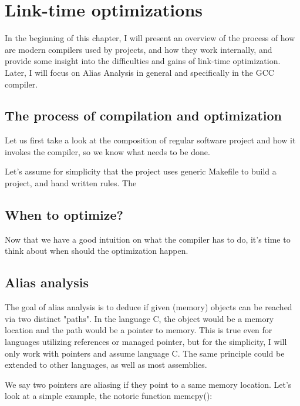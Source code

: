%
\newcommand{\definice}{\paragraph{Definice.}}

\chapter{Link-time optimizations}

In the beginning of this chapter, I will present an overview of the process of
how are modern compilers used by projects, and how they work internally, and
provide some insight into the difficulties and gains of link-time optimization.
Later, I will focus on Alias Analysis in general and specifically in the GCC
compiler.

\section{The process of compilation and optimization}

Let us first take a look at the composition of regular software project and how
it invokes the compiler, so we know what needs to be done.

Let's assume for simplicity that the project uses generic Makefile to build a
project, and hand written rules. The

\section{When to optimize?}

Now that we have a good intuition on what the compiler has to do, it's time to
think about when should the optimization happen.




\section{Alias analysis}

The goal of alias analysis is to deduce if given (memory) objects can be reached
via two distinct "paths". In the language C, the object would be a memory
location and the path would be a pointer to memory. This is true even for
languages utilizing references or managed pointer, but for the simplicity, I
will only work with pointers and assume language C. The same principle could be
extended to other languages, as well as most assemblies.

We say two pointers are aliasing if they point to a same memory location. Let's
look at a simple example, the notoric function memcpy():

